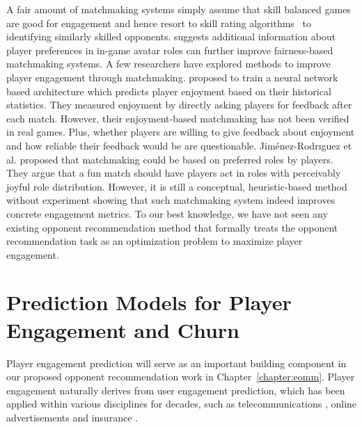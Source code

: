 A fair amount of matchmaking systems simply assume that skill balanced games are good for engagement \cite{graepel2006ranking,sweetser2005gameflow,flow1990psychology,chen2007flow} and hence resort to skill rating algorithms~\cite{glickman1999parameter,elo1978rating,herbrich:trueskill} to identifying similarly skilled opponents. \cite{myslak2014developing} suggests additional information about player preferences in in-game avatar roles can further improve fairness-based matchmaking systems. A few researchers have explored methods to improve player engagement through matchmaking. \cite{Delalleau2012} proposed to train a neural network based architecture which predicts player enjoyment based on their historical statistics. They measured enjoyment by directly asking players for feedback after each match. However, their enjoyment-based matchmaking has not been verified in real games. Plus, whether players are willing to give feedback about enjoyment and how reliable their feedback would be are questionable. Jim{\'e}nez-Rodr{\i}guez et al. \cite{jimenez2011matchmaking} proposed that matchmaking could be based on preferred roles by players. They argue that a fun match should have players act in  roles with perceivably joyful role distribution. However, it is still a conceptual, heuristic-based method without experiment showing that such matchmaking system indeed improves concrete engagement metrics. To our best knowledge, we have not seen any existing opponent recommendation method that formally treats the opponent recommendation task as an optimization problem to maximize player engagement. 




\section{Prediction Models for Player Engagement and Churn}


Player engagement prediction will serve as an important building component in our proposed opponent recommendation work in Chapter~\ref{chapter:eomm}. Player engagement naturally derives from user engagement prediction, which has been applied within various disciplines for decades, such as telecommunications \cite{ferreira2004data}, online advertisements \cite{yoon2010prediction} and insurance \cite{morik2004analysing}. 

